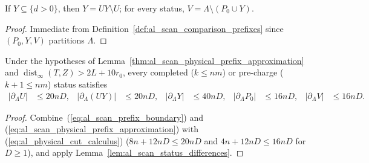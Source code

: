 \begin{lemma}
    \label{lem:al_scan_status_differences}
    \leanok
    If $Y\subseteq\{d>0\}$, then $Y=UY\setminus U$; for every status,
    $V=\Lambda\setminus(P_0\cup Y)$.
\end{lemma}
\begin{proof}\leanok
    Immediate from Definition~\ref{def:al_scan_comparison_prefixes} since
    $(P_0,Y,V)$ partitions $\Lambda$.
\end{proof}

\begin{lemma}
    \label{thm:al_scan_status_cuts}
    \leanok
    Under the hypotheses of Lemma~\ref{thm:al_scan_physical_prefix_approximation}
    and $\operatorname{dist}_\infty(T,Z)>2L+10r_0$, every completed ($k\le nm$)
    or pre-charge ($k+1\le nm$) status satisfies
    \begin{align}
        |\partial_\Lambda U|   & \le20nD, & |\partial_\Lambda(UY)| & \le20nD, &
        |\partial_\Lambda Y|   & \le40nD, &
        |\partial_\Lambda P_0| & \le16nD, & |\partial_\Lambda V|   & \le16nD.
        \label{eq:al_scan_status_cuts}
    \end{align}
\end{lemma}
\begin{proof}\leanok
    Combine~(\ref{eq:al_scan_prefix_boundary}) and
    (\ref{eq:al_scan_physical_prefix_approximation}) with
    (\ref{eq:al_physical_cut_calculus}) ($8n+12nD\le20nD$ and $4n+12nD\le16nD$
    for $D\ge1$), and apply Lemma~\ref{lem:al_scan_status_differences}.
\end{proof}

